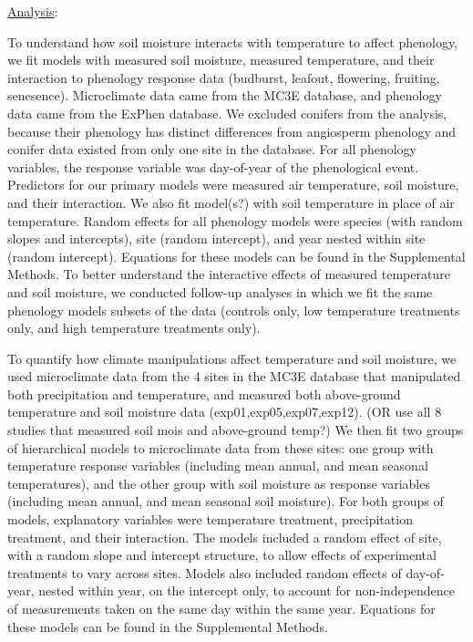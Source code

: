 \documentclass{article}
\begin{document}
\begin{singlespace}
\underline{Analysis}:

\par To understand how soil moisture interacts with temperature to affect phenology, we fit models with measured soil moisture, measured temperature, and their interaction to phenology response data (budburst, leafout, flowering, fruiting, senesence). Microclimate data came from the MC3E database, and phenology data came from the ExPhen database. We excluded conifers from the analysis, because their phenology has distinct differences from angiosperm phenology \cite{polgar2014} and conifer data existed from only one site in the database. For all phenology variables, the response variable was day-of-year of the phenological event. Predictors for our primary models were measured air temperature, soil moisture, and their interaction. We also fit model(s?) with soil temperature in place of air temperature. Random effects for all phenology models were species (with random slopes and intercepts), site (random intercept), and year nested within site (random intercept). Equations for these models can be found in the Supplemental Methods. 
To better understand the interactive effects of measured temperature and soil moisture, we conducted follow-up analyses in which we fit the same phenology models subsets of the data (controls only, low temperature treatments only, and high temperature treatments only).
\par To quantify how climate manipulations affect temperature and soil moisture, we used microclimate data from the 4 sites in the MC3E database that manipulated both precipitation and temperature, and measured both above-ground temperature and soil moisture data (exp01,exp05,exp07,exp12). (OR use all 8 studies that measured soil mois and above-ground temp?) We then fit two groups of hierarchical models to microclimate data from these sites: one group with temperature response variables (including mean annual, and mean seasonal temperatures), and the other group with soil moisture as response variables (including mean annual, and mean seasonal soil moisture). For both groups of models, explanatory variables were temperature treatment, precipitation treatment, and their interaction. The models included a random effect of site, with a random slope and intercept structure, to allow effects of experimental treatments to vary across sites. Models also included random effects of day-of-year, nested within year, on the intercept only, to account for non-independence of measurements taken on the same day within the same year. Equations for these models can be found in the Supplemental Methods. 

\end{singlespace}
\end{document}
